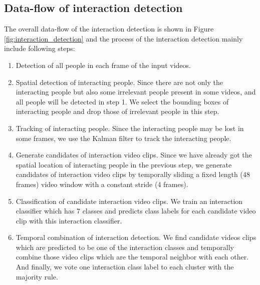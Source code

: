 \subsection{Data-flow of interaction detection}
The overall data-flow of the interaction detection is shown in Figure \ref{fig:interaction_detection} and the process of the interaction detection mainly include following steps: 
\begin{enumerate}
	\item Detection of all people in each frame of the input videos.
	
	\item Spatial detection of interacting people. Since there are not only the interacting people but also some irrelevant people present in some videos, and all people will be detected in step 1. We select the bounding boxes of interacting people and drop those of irrelevant people  in this step.
	
	\item Tracking of interacting people. Since the interacting people may be lost in some frames, we use the Kalman filter to track the interacting people. 
	
	\item Generate candidates of interaction video clips. Since we have already got the spatial location of interacting people in the previous step, we generate candidates of interaction video clips by temporally sliding a fixed length (48 frames) video window with a constant stride (4 frames).
	
	\item Classification of candidate interaction video clips. We train an interaction classifier which has 7 classes and predicts class labels for each candidate video clip with this interaction classifier. 
	
	\item Temporal combination of interaction detection. We find candidate videos clips which are predicted to be one of the interaction classes and temporally combine those video clips which are the temporal neighbor with each other. And finally, we vote one interaction class label to each cluster with the majority rule.       
\end{enumerate} 
  
